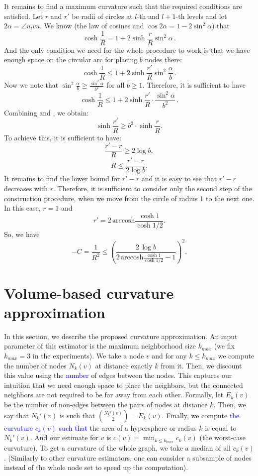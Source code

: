 \documentclass{article} %
\newcommand{\ph}[1]{\textcolor{blue}{#1}}
\begin{document}
It remains to find a maximum curvature such that the required conditions are satisfied. Let $r$ and $r'$ be radii of circles at $l$-th and $l+1$-th levels and let $2\alpha = \angle u_l v u$. We know (the law of cosines and $\cos 2\alpha = 1 - 2\sin^2 \alpha$) that
\begin{equation}\label{eq:1}
\cosh \frac{1}{R} = 1 + 2 \sinh \frac{r}{R} \sin^2 \alpha \,.
\end{equation}
And the only condition we need for the whole procedure to work is that we have enough space on the circular arc for placing $b$ nodes there:
\[
\cosh \frac{1}{R} \le 1 + 2 \sinh \frac{r'}{R} \sin^2 \frac{\alpha}{b} \,.
\]
Now we note that $\sin^2 \frac{\alpha}{b} \ge \frac{\sin^2 \alpha}{b^2}$ for all $b \ge 1$. Therefore, it is sufficient to have
\begin{equation}\label{eq:2}
\cosh \frac{1}{R} \le 1 + 2 \sinh \frac{r'}{R} \cdot \frac{\sin^2 \alpha}{b^2} \,.
\end{equation}
Combining  and , we obtain:
\[
\sinh \frac{r'}{R} \ge b^2 \cdot \sinh \frac{r}{R}.
\]
To achieve this, it is sufficient to have: 
\[
\frac{r' - r}{R} \ge 2 \log b,
\]
\[
R \le \frac{r' - r}{2 \log b}.
\]
It remains to find the lower bound for $r' - r$ and it is easy to see that $r' - r$ decreases with $r$. Therefore, it is sufficient to consider only the second step of the construction procedure, when we move from the circle of radius 1 to the next one. In this case, $r = 1$ and 
\[
r' = 2 \, \mathrm{arccosh} \frac{\cosh 1}{\cosh 1/2}.
\]
So, we have 
\[
-C = \frac{1}{R^2} \le \left( \frac{2\,\log b}{2 \, \mathrm{arccosh} \frac{\cosh 1}{\cosh 1/2} - 1} \right)^2.
\]

\section{Volume-based curvature approximation}

In this section, we describe the proposed curvature approximation. An input parameter of this estimator is the maximum neighborhood size $k_{max}$ (we fix $k_{max} = 3$ in the experiments). We take a node $v$ and for any $k \le k_{max}$ we compute the number of nodes $N_k(v)$ at distance exactly $k$ from it.
Then, we discount this value using the \ph{number} of edges between the nodes.
This captures our intuition that we need enough space to place the neighbors, but the connected neighbors are not required to be far away from each other.
Formally, let $E_k(v)$ be the number of non-edges between the pairs of nodes at distance $k$. Then, we say that $N_k'(v)$ is such that ${N_k'(v) \choose 2} = E_k(v)$.  Finally, we compute \ph{the curvature $c_k(v)$ such that} the area of a hypersphere or radius $k$ is equal to $N_k'(v)$. And our estimate for $v$ is $c(v) = \min_{k \le k_{max}} c_k(v)$ (the worst-case curvature). To get a curvature of the whole graph, we take a median of all $c_k(v)$. (Similarly to other curvature estimators, one can consider a subsample of nodes instead of the whole node set to speed up the computation).
\end{document}
